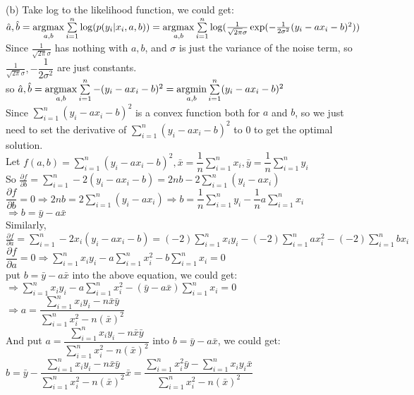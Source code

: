 \documentclass[10pt]{article}
\begin{document}
\begin{enumerate}[1.]
(b) 
Take log to the likelihood function, we could get:\\
$\hat{a},\hat{b}=\mathop{\rm argmax}\limits_{a,b}\sum\limits_{i=1}^n\log(p(y_i|x_i,a,b))=\mathop{\rm argmax}\limits_{a,b}\sum\limits_{i=1}^n\log(\frac{1}{\sqrt{2\pi}\sigma}\exp(-\frac{1}{2\sigma^2}(y_i-ax_i-b)^2))$\\
Since $\frac{1}{\sqrt{2\pi}\sigma}$ has nothing with $a,b$, and $\sigma$ is just the variance of the noise term, so $\frac{1}{\sqrt{2\pi}\sigma}, -\dfrac{1}{2\sigma^2}$ are just constants.\\
so $\hat{a},\hat{b}=\mathop{\rm argmax}\limits_{a,b}\sum\limits_{i=1}^n-(y_i-ax_i-b)^2=\mathop{\rm argmin}\limits_{a,b}\sum\limits_{i=1}^n(y_i-ax_i-b)^2$\\
Since $\sum\limits_{i=1}^n(y_i-ax_i-b)^2$ is a convex function both for $a$ and $b$, so we just need to set the derivative of $\sum\limits_{i=1}^n(y_i-ax_i-b)^2$ to 0 to get the optimal solution.\\
Let $f(a,b)=\sum\limits_{i=1}^n(y_i-ax_i-b)^2,\bar{x}=\dfrac{1}{n}\sum\limits_{i=1}^nx_i,\bar{y}=\dfrac{1}{n}\sum\limits_{i=1}^ny_i$\\

So $\frac{\partial f}{\partial b}=\sum\limits_{i=1}^n-2(y_i-ax_i-b)=2nb-2\sum\limits_{i=1}^n(y_i-ax_i)$\\
$\dfrac{\partial f}{\partial b}=0 \Rightarrow 2nb=2\sum\limits_{i=1}^n(y_i-ax_i)\Rightarrow b=\dfrac{1}{n}\sum\limits_{i=1}^ny_i-\dfrac{1}{n}a\sum\limits_{i=1}^nx_i$\\
$\Rightarrow b=\bar{y}-a\bar{x}$\\

Similarly, $\frac{\partial f}{\partial a}=\sum\limits_{i=1}^n-2x_i(y_i-ax_i-b)=(-2)\sum\limits_{i=1}^nx_iy_i-(-2)\sum\limits_{i=1}^nax_i^2-(-2)\sum\limits_{i=1}^nbx_i$\\
$\dfrac{\partial f}{\partial a}=0\Rightarrow \sum\limits_{i=1}^nx_iy_i-a\sum\limits_{i=1}^nx_i^2-b\sum\limits_{i=1}^nx_i=0$\\
put $b=\bar{y}-a\bar{x}$ into the above equation, we could get:\\
$\Rightarrow \sum\limits_{i=1}^nx_iy_i-a\sum\limits_{i=1}^nx_i^2-(\bar{y}-a\bar{x})\sum\limits_{i=1}^nx_i=0$\\
$\Rightarrow a=\dfrac{\sum\limits_{i=1}^nx_iy_i-n\bar{x}\bar{y}}{\sum\limits_{i=1}^nx_i^2-n(\bar{x})^2}$\\

And put $a=\dfrac{\sum\limits_{i=1}^nx_iy_i-n\bar{x}\bar{y}}{\sum\limits_{i=1}^nx_i^2-n(\bar{x})^2}$ into $b=\bar{y}-a\bar{x}$, we could get:\\
$b=\bar{y}-\dfrac{\sum\limits_{i=1}^nx_iy_i-n\bar{x}\bar{y}}{\sum\limits_{i=1}^nx_i^2-n(\bar{x})^2}\bar{x}=\dfrac{\sum\limits_{i=1}^nx_i^2\bar{y}-\sum\limits_{i=1}^nx_iy_i\bar{x}}{\sum\limits_{i=1}^nx_i^2-n(\bar{x})^2}$\\


\end{enumerate}
\end{document}
